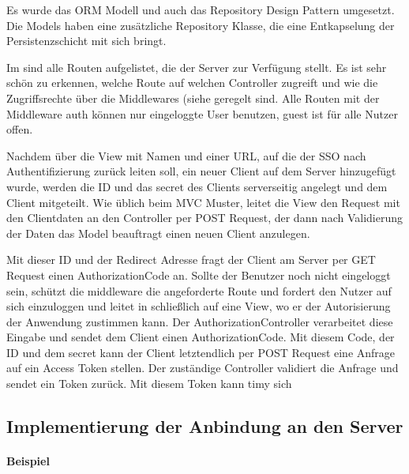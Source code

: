 Es wurde das ORM Modell und auch das Repository Design Pattern umgesetzt. Die Models haben eine zusätzliche  Repository Klasse, die eine Entkapselung der Persistenzschicht mit sich bringt.

Im  sind alle Routen aufgelistet, die der Server zur Verfügung stellt. Es ist sehr schön zu erkennen, welche Route auf welchen Controller zugreift und wie die Zugriffsrechte über die Middlewares (siehe  geregelt sind. Alle Routen mit der Middleware auth können nur eingeloggte User benutzen, guest ist für alle Nutzer offen.

Nachdem über die View mit Namen und einer URL, auf die der SSO nach Authentifizierung zurück leiten soll, ein neuer Client auf dem Server hinzugefügt wurde, werden die ID und das secret des Clients serverseitig angelegt und dem Client mitgeteilt. Wie üblich beim MVC Muster, leitet die View den Request mit den Clientdaten an den Controller per POST Request, der dann nach Validierung der Daten das Model beauftragt einen neuen Client anzulegen. 

Mit dieser ID und der Redirect Adresse fragt der Client am Server per GET Request einen AuthorizationCode an. Sollte der Benutzer noch nicht eingeloggt sein, schützt die middleware die angeforderte Route und fordert den Nutzer auf sich einzuloggen und leitet in schließlich auf eine View, wo er der Autorisierung der Anwendung zustimmen kann. Der AuthorizationController verarbeitet diese Eingabe und sendet dem Client einen AuthorizationCode. Mit diesem Code, der ID und dem secret kann der Client letztendlich per POST Request eine Anfrage auf ein Access Token stellen. Der zuständige Controller validiert die Anfrage und sendet ein Token zurück. Mit diesem Token kann timy sich 




\subsection{Implementierung der Anbindung an den Server}
\label{sec:ImplementierungCient}


\paragraph{Beispiel}


